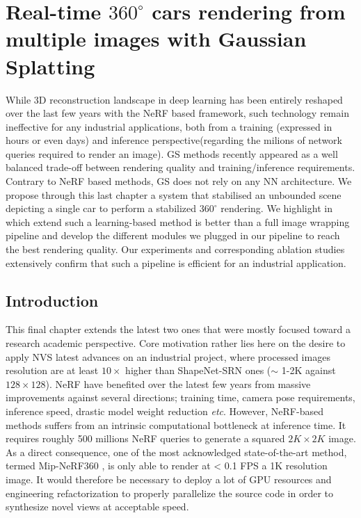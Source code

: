\chapter{Real-time $360 ^{\circ} $ cars rendering from multiple images with Gaussian Splatting}
\label{chapter:gausssplat}



While 3D reconstruction landscape in deep learning has been entirely reshaped over the last few years with the \ac{NeRF} based framework, such technology remain ineffective for any industrial applications, both from a training (expressed in hours or even days) and inference perspective(regarding the milions of network queries required to render an image). \ac{GS} methods recently appeared as a well balanced trade-off between rendering quality and training/inference requirements. Contrary to \ac{NeRF} based methods, \ac{GS} does not rely on any \ac{NN} architecture. We propose through this last chapter a system that stabilised an unbounded scene depicting a single car to perform a stabilized $360 ^{\circ} $ rendering. We highlight in which extend such a learning-based method is better than a full image wrapping pipeline and develop the different modules we plugged in our pipeline to reach the best rendering quality. Our experiments and corresponding ablation studies extensively confirm that such a pipeline is efficient for an industrial application. 

\section{Introduction}
This final chapter extends the latest two ones that were mostly focused toward a research academic perspective. Core motivation rather lies here on the desire to apply \ac{NVS} latest advances on an industrial project, where processed images resolution are at least $10\times$ higher than ShapeNet-SRN \citep{chang2015shapenet,sitzmann2019scene} ones ($\sim$ 1-2K against $128\times128$). \ac{NeRF} have benefited over the latest few years from massive improvements against several directions; training time, camera pose requirements, inference speed, drastic model weight reduction \textit{etc}. 
However, \ac{NeRF}-based methods suffers from an intrinsic computational bottleneck at inference time. It requires roughly 500 millions \ac{NeRF} queries to generate a squared $2K\times2K$ image. As a direct consequence, one of the most acknowledged state-of-the-art method, termed Mip-NeRF360 \citep{barron2022mip}, is only able to render at < 0.1 \ac{FPS} a 1K resolution image. It would therefore be necessary to deploy a lot of \ac{GPU} resources and engineering refactorization to properly parallelize the source code in order to synthesize novel views at acceptable speed. 

